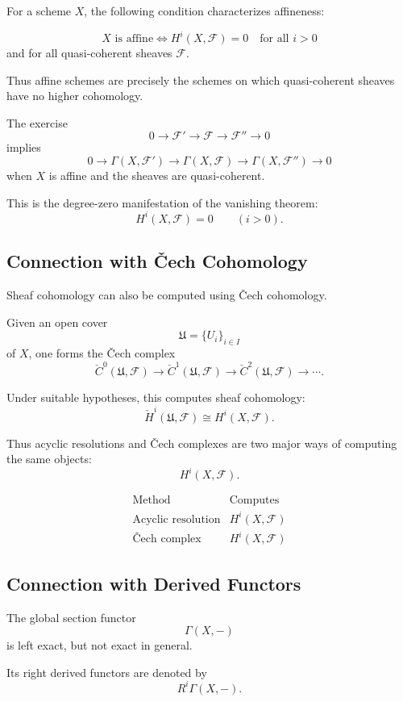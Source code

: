 \documentclass[12pt,a4paper]{article}
\theoremstyle{notespace}
\begin{document}
For a scheme \(X\), the following condition characterizes affineness:

\[
X \text{ is affine}
\iff
H^i(X,\mathcal F)=0
\quad
\text{for all } i>0
\]
and for all quasi-coherent sheaves \(\mathcal F\).

Thus affine schemes are precisely the schemes on which quasi-coherent sheaves have no higher cohomology.

The exercise
\[
0\to \mathcal F'\to \mathcal F\to \mathcal F''\to 0
\]
implies
\[
0\to \Gamma(X,\mathcal F')
\to \Gamma(X,\mathcal F)
\to \Gamma(X,\mathcal F'')
\to 0
\]
when \(X\) is affine and the sheaves are quasi-coherent.

This is the degree-zero manifestation of the vanishing theorem:
\[
H^i(X,\mathcal F)=0
\qquad (i>0).
\]

\subsection{Connection with \v{C}ech Cohomology}

Sheaf cohomology can also be computed using \v{C}ech cohomology.

Given an open cover
\[
\mathfrak U=\{U_i\}_{i\in I}
\]
of \(X\), one forms the \v{C}ech complex
\[
\check C^0(\mathfrak U,\mathcal F)
\to
\check C^1(\mathfrak U,\mathcal F)
\to
\check C^2(\mathfrak U,\mathcal F)
\to
\cdots .
\]

Under suitable hypotheses, this computes sheaf cohomology:
\[
\check H^i(\mathfrak U,\mathcal F)
\cong
H^i(X,\mathcal F).
\]

Thus acyclic resolutions and \v{C}ech complexes are two major ways of computing the same objects:
\[
H^i(X,\mathcal F).
\]

\[
\begin{array}{c|c}
	\text{Method} & \text{Computes} \\
	\hline
	\text{Acyclic resolution} & H^i(X,\mathcal F) \\
	\text{\v{C}ech complex} & H^i(X,\mathcal F)
\end{array}
\]

\subsection{Connection with Derived Functors}

The global section functor
\[
\Gamma(X,-)
\]
is left exact, but not exact in general.

Its right derived functors are denoted by
\[
R^i\Gamma(X,-).
\]
\end{document}
